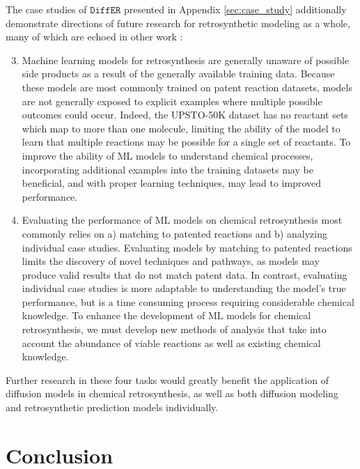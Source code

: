 \documentclass{article}
\newcommand{\ours}{$\texttt{DiffER}$\xspace}
\begin{document}
The case studies of \ours presented in Appendix \ref{sec:case_study} additionally demonstrate directions of future research for retrosynthetic modeling as a whole, many of which are echoed in other work \cite{chen2023g}:
\begin{enumerate}
    \setcounter{enumi}{2}
    \item Machine learning models for retrosynthesis are generally unaware of possible side products as a result of the generally available training data. Because these models are most commonly trained on patent reaction datasets, models are not generally exposed to explicit examples where multiple possible outcomes could occur. Indeed, the UPSTO-50K dataset has no reactant sets which map to more than one molecule, limiting the ability of the model to learn that multiple reactions may be possible for a single set of reactants. To improve the ability of ML models to understand chemical processes, incorporating additional examples into the training datasets may be beneficial, and with proper learning techniques, may lead to improved performance.
    \item Evaluating the performance of ML models on chemical retrosynthesis most commonly relies on a) matching to patented reactions and b) analyzing individual case studies. Evaluating models by matching to patented reactions limits the discovery of novel techniques and pathways, as models may produce valid results that do not match patent data. In contrast, evaluating individual case studies is more adaptable to understanding the model's true performance, but is a time consuming process requiring considerable chemical knowledge. To enhance the development of ML models for chemical retrosynthesis, we must develop new methods of analysis that take into account the abundance of viable reactions as well as existing chemical knowledge.
\end{enumerate}
Further research in these four tasks would greatly benefit the application of diffusion models in chemical retrosynthesis, as well as both diffusion modeling and retrosynthetic prediction models individually.


\section{Conclusion}
\end{document}
